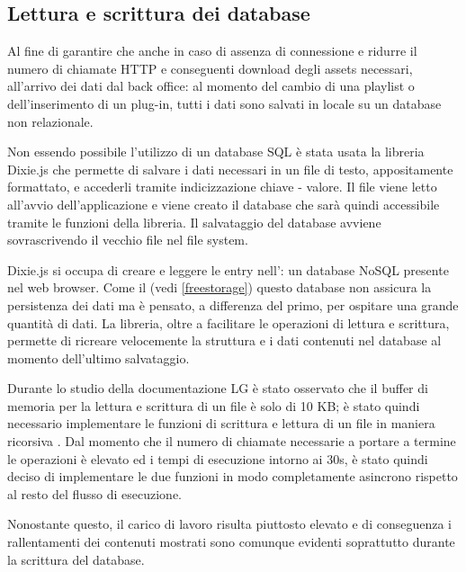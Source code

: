 \subsection{Lettura e scrittura dei database} \label{database}

Al fine di garantire che anche in caso di assenza di connessione e ridurre il numero di chiamate HTTP e conseguenti download degli assets necessari, all'arrivo dei dati dal back office: al momento del cambio di una playlist o dell'inserimento di un plug-in, tutti i dati sono salvati in locale su un database non relazionale.

Non essendo possibile l'utilizzo di un database SQL  è stata usata la libreria Dixie.js \cite{dixie} che permette di salvare i dati necessari in un file di testo, appositamente formattato, e accederli tramite indicizzazione chiave - valore. Il file viene letto all'avvio dell'applicazione e viene creato il database che sarà quindi accessibile tramite le funzioni della libreria. Il salvataggio del database avviene sovrascrivendo il vecchio file nel file system.

Dixie.js si occupa di creare e leggere le entry nell': un database NoSQL presente nel web browser. Come il  (vedi \ref*{freestorage}) questo database non assicura la persistenza dei dati ma è pensato, a differenza del primo, per ospitare una grande quantità di dati. La libreria, oltre a facilitare le operazioni di lettura e scrittura, permette di ricreare velocemente la struttura e i dati contenuti nel database al momento dell'ultimo salvataggio.

Durante lo studio della documentazione LG è stato osservato che il buffer di memoria per la lettura e scrittura di un file è solo di 10 KB; è stato quindi necessario implementare le funzioni di scrittura e lettura di un file in maniera ricorsiva .
Dal momento che il numero di chiamate necessarie a portare a termine le operazioni è elevato ed i tempi di esecuzione intorno ai 30s, è stato quindi deciso di implementare le due funzioni in modo completamente asincrono rispetto al resto del flusso di esecuzione. 

Nonostante questo, il carico di lavoro risulta piuttosto elevato e di conseguenza i rallentamenti dei contenuti mostrati sono comunque evidenti soprattutto durante la scrittura del database. 




